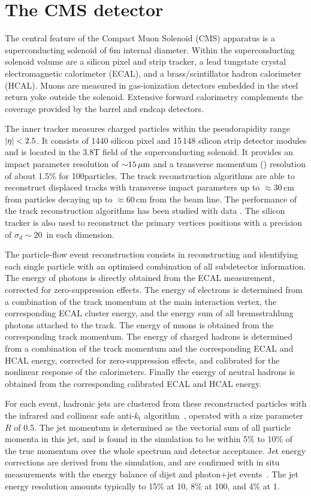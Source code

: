 \section{The CMS detector}

The central feature of the Compact Muon Solenoid (CMS) apparatus is a superconducting solenoid of 6\unit{m} internal diameter. Within the superconducting solenoid volume are a silicon pixel and strip tracker, a lead tungstate crystal electromagnetic calorimeter (ECAL), and a brass/scintillator hadron calorimeter (HCAL). Muons are measured in gas-ionization detectors embedded in the steel return yoke outside the solenoid. Extensive forward calorimetry complements the coverage provided by the barrel and endcap detectors. 

The inner tracker measures charged particles within the pseudorapidity range $\lvert \eta \rvert< 2.5$. It consists of 1440 silicon pixel and 15\,148 silicon strip detector modules and is located in the 3.8\unit{T} field of the superconducting solenoid. It provides an impact parameter resolution of ${\sim}15\,\mu\text{m}$ and a transverse momentum (\pt) resolution of about 1.5\% for 100\GeVc particles. 
The track reconstruction algorithms are able to reconstruct displaced tracks with transverse impact
parameters up to $\approx 30$\,cm from particles decaying up to $\approx 60$\,cm from the beam line.  The
performance of the track reconstruction algorithms has been studied with data
\cite{Khachatryan:2010pw}. The silicon
tracker is also used to reconstruct the primary vertices positions with a
precision of $\sigma_d\sim 20$~\mum in each dimension.

The particle-flow event reconstruction consists in reconstructing and identifying each single particle with an optimised combination of all subdetector information. The energy of photons is directly obtained from the ECAL measurement, corrected for zero-suppression effects. The energy of electrons is determined from a combination of the track momentum at the main interaction vertex, the corresponding ECAL cluster energy, and the energy sum of all bremsstrahlung photons attached to the track. The energy of muons is obtained from the corresponding track momentum. The energy of charged hadrons is determined from a combination of the track momentum and the corresponding ECAL and HCAL energy, corrected for zero-suppression effects, and calibrated for the nonlinear response of the calorimeters. Finally the energy of neutral hadrons is obtained from the corresponding calibrated ECAL and HCAL energy. 

For each event, hadronic jets are clustered from these reconstructed particles with the infrared and collinear safe anti-$k_\mathrm{t}$ algorithm~\cite{Cacciari:2008gp}, operated with a size parameter $R$ of 0.5. The jet momentum is determined as the vectorial sum of all particle momenta in this jet, and is found in the simulation to be within 5\% to 10\% of the true momentum over the whole \pt spectrum and detector acceptance. Jet energy corrections are derived from the simulation, and are confirmed with in situ measurements with the energy balance of dijet and photon+jet events~\cite{CMS-PAS-JME-10-010}. The jet energy resolution amounts typically to 15\% at 10\GeV, 8\% at 100\GeV, and 4\% at 1\TeV. 
